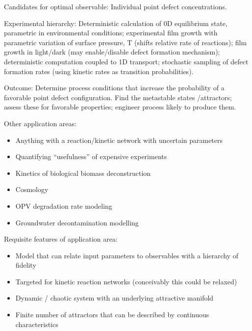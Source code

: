 \documentclass[11pt]{article}
\begin{document}
Candidates for optimal observable: Individual point defect concentrations. 

Experimental hierarchy: Deterministic calculation of 0D equilibrium state, parametric in environmental conditions; experimental film growth with parametric variation of surface pressure, T (shifts relative rate of reactions); film growth in light/dark (may enable/disable defect formation mechanism); deterministic computation coupled to 1D transport; stochastic sampling of defect formation rates (using kinetic rates as transition probabilities).

Outcome: Determine process conditions that increase the probability of a favorable point defect configuration. Find the metastable states /attractors; assess these for favorable properties; engineer process likely to produce them. 

Other application areas:
\begin{itemize}
\item Anything with a reaction/kinetic network with uncertain parameters
\item Quantifying ``usefulness'' of expensive experiments
\item Kinetics of biological biomass deconstruction
\item Cosmology
\item OPV degradation rate modeling
\item Groundwater decontamination modelling 
\end{itemize}

Requisite features of application area:
\begin{itemize}
\item Model that can relate input parameters to observables with a hierarchy of fidelity
\item Targeted for kinetic reaction networks (conceivably this could be relaxed)
\item Dynamic / chaotic system with an underlying attractive manifold 
\item Finite number of attractors that can be described by continuous characteristics
\end{itemize}





 
\end{document}
